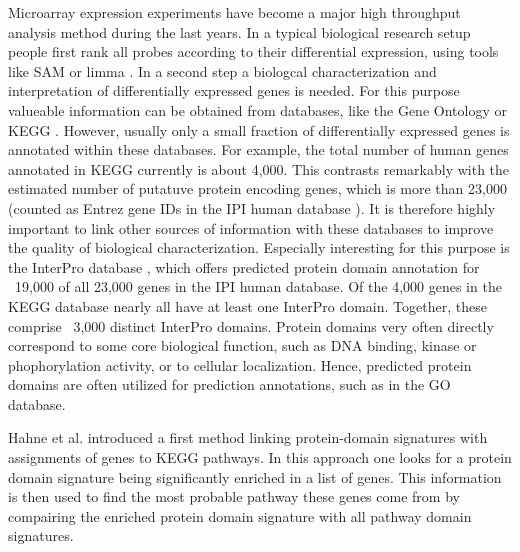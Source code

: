 \documentclass[11pt,a4paper]{article}
\begin{document}
Microarray expression experiments have become a major high throughput analysis method during the last years. In a typical biological research setup people first rank all probes according to their differential expression, using tools like SAM or limma \cite{Smith2004Limma, Tusher2001SAM}. In a second step a biologcal characterization and interpretation of differentially expressed genes is needed. For this purpose valueable information can be obtained from databases, like the Gene Ontology \cite{GOConsortium04} or KEGG \cite{Kanehisa2008KEGG}. However, usually only a small fraction of differentially expressed genes is annotated within these databases. For example, the total number of human genes annotated in KEGG currently is about 4,000. This contrasts remarkably with the estimated number of putatuve protein encoding genes, which is more than 23,000 (counted as Entrez gene IDs in the IPI human database \cite{Kersey2004IPI,Maglott2007Entrez}). It is therefore highly important to link other sources of information with these databases to improve the quality of biological characterization. Especially interesting for this purpose is the InterPro database \cite{Mulder2008InterPro}, which offers predicted protein domain annotation for ~19,000 of all 23,000 genes in the IPI human database. Of the 4,000 genes in the KEGG database nearly all have at least one InterPro domain. Together, these comprise ~3,000 distinct InterPro domains. Protein domains very often directly correspond to some core biological function, such as DNA binding, kinase or phophorylation activity, or to cellular localization. Hence, predicted protein domains are often utilized for prediction annotations, such as in the GO database. 

Hahne et al. \cite{Hahne2008} introduced a first method linking protein-domain signatures with assignments of genes to KEGG pathways. In this approach one looks for a protein domain signature being significantly enriched in a list of genes. This information is then used to find the most probable pathway these genes come from by compairing the enriched protein domain signature with all pathway domain signatures.
\end{document}
